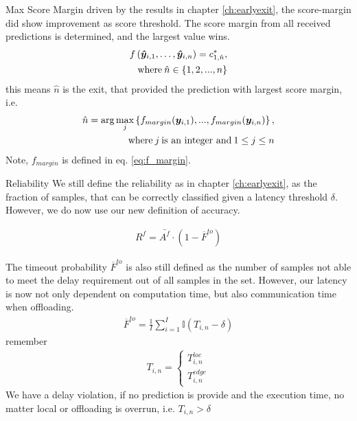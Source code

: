 \begin{enumdescript}
\begin{enumdescript}
			\item[Max Score Margin] driven by the results in chapter \ref{ch:earlyexit}, the score-margin did show improvement as score threshold. The score margin from all received predictions is determined, and the largest value wins.
			\begin{align}
			\begin{split}
			f\left(\bm{\hat{y}}_{i,1}, \dots, \bm{\hat{y}}_{i,n} \right) =c^*_{1,\hat{n}},\\
			\text{where\:} \hat{n} \in \{1, 2, ..., n\}
			\end{split}	
			\end{align}
			this means $ \hat{n} $ is the exit, that provided the prediction with largest score margin, i.e.
			\begin{align*}
			\begin{split}
				\hat{n} = \arg \underset{j}{\max} \left\{f_{margin}(\bm{y}_{i,1}), ..., f_{margin}(\bm{y}_{i,n})\right\} ,\\
				\text{where\:} j \text{\:is an integer and\:} 1 \le j \le n
			\end{split}
			\end{align*}
			Note, $ f_{margin} $ is defined in eq. \ref{eq:f_margin}.
		\end{enumdescript}
	
		\item[Reliability]  We still define the reliability as in chapter \ref{ch:earlyexit}, as the fraction of samples, that can be correctly classified given a latency threshold $ \delta $. However, we do now use our new definition of accuracy.
		
		\begin{align}
		R^f= \bar{A^f} \cdot (1-\overline{F}^{to})
		\end{align}
		
		The timeout probability $ \overline{F}^{to} $ is also still defined as the number of samples not able to meet the delay requirement out of all samples in the set. However, our latency is now not only dependent on computation time, but also communication time when offloading.
		\begin{align}
		\overline{F}^{to}=\frac{1}{I}\sum_{i=1}^{I} \mathbb{I}\left(T_{i,n}-\delta\right)
		\end{align}
		remember
		\begin{align*}
			T_{i,n} = \begin{cases}
				T_{i,n}^{loc} \\
				T_{i,n}^{edge}
			\end{cases}
		\end{align*}
		We have a delay violation, if no prediction is provide and the execution time, no matter local or offloading is overrun, i.e. $ T_{i,n} > \delta $  
	

\end{enumdescript}
